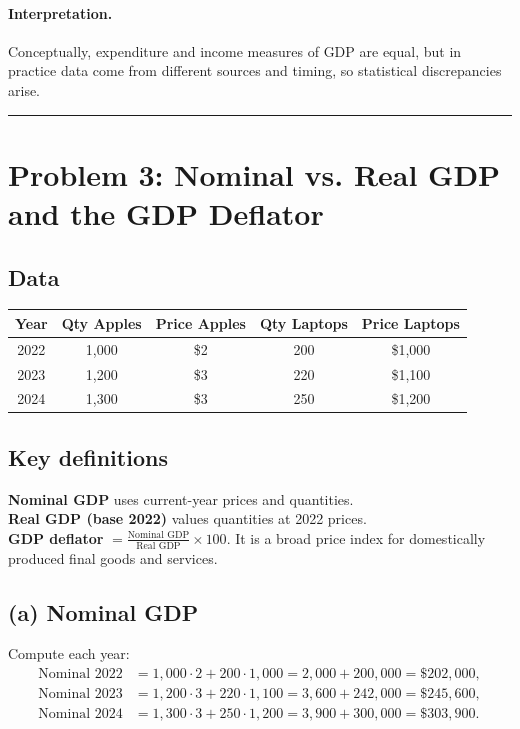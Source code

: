 \documentclass[11pt]{article}
\newcommand{\defn}[1]{\textbf{#1}}
\newcommand{\bn}{\vspace{0.25em}\noindent}
\begin{document}
\paragraph{Interpretation.} Conceptually, expenditure and income measures of GDP are equal, but in practice data come from different sources and timing, so statistical discrepancies arise.

\bigskip
\hrule
\bigskip

\section*{Problem 3: Nominal vs. Real GDP and the GDP Deflator}

\subsection*{Data}
\begin{center}
\begin{tabular}{c c c c c}
\toprule
Year & Qty Apples & Price Apples & Qty Laptops & Price Laptops \\
\midrule
2022 & 1{,}000 & \$2 & 200 & \$1{,}000 \\
2023 & 1{,}200 & \$3 & 220 & \$1{,}100 \\
2024 & 1{,}300 & \$3 & 250 & \$1{,}200 \\
\bottomrule
\end{tabular}
\end{center}

\subsection*{Key definitions}
\bn \defn{Nominal GDP} uses current-year prices and quantities.\\
\defn{Real GDP (base 2022)} values quantities at 2022 prices.\\
\defn{GDP deflator} \(=\frac{\text{Nominal GDP}}{\text{Real GDP}}\times 100\). It is a broad price index for domestically produced final goods and services.

\subsection*{(a) Nominal GDP}
Compute each year:
\[
\begin{aligned}
\text{Nominal }2022 &= 1{,}000\cdot 2 + 200\cdot 1{,}000 = 2{,}000 + 200{,}000 = \$202{,}000,\\
\text{Nominal }2023 &= 1{,}200\cdot 3 + 220\cdot 1{,}100 = 3{,}600 + 242{,}000 = \$245{,}600,\\
\text{Nominal }2024 &= 1{,}300\cdot 3 + 250\cdot 1{,}200 = 3{,}900 + 300{,}000 = \$303{,}900.
\end{aligned}
\]
\end{document}

